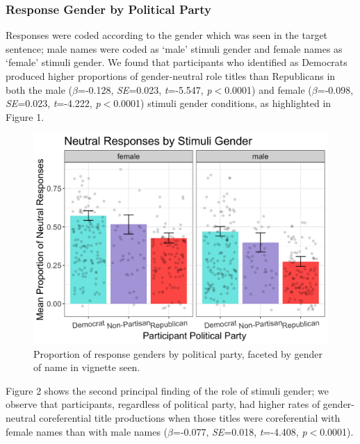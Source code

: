\documentclass[10pt,letterpaper]{article}
\begin{document}
	\subsubsection{Response Gender by Political Party}
	Responses were coded according to the gender which was seen in the target sentence; male names were coded as `male' stimuli gender and female names as `female' stimuli gender. We found that participants who identified as Democrats produced higher proportions of gender-neutral role titles than Republicans in both the male ($\beta$=-0.128, \textit{SE}=0.023, \textit{t}=-5.547, \textit{p}$<$0.0001) and female ($\beta$=-0.098, \textit{SE}=0.023, \textit{t}=-4.222, \textit{p}$<$0.0001) stimuli gender conditions, as highlighted in Figure 1.
	
	\begin{figure}[ht!]
		\centering
		\includegraphics[scale=0.115]{prod_neutral_poli_bar_nonmean.png}
		\caption{Proportion of response genders by political party, faceted by gender of name in vignette seen.}
		\label{prod-box}
	\end{figure}
	
	Figure 2 shows the second principal finding of the role of stimuli gender; we observe that participants, regardless of political party, had higher rates of gender-neutral coreferential title productions when those titles were coreferential with female names than with male names  ($\beta$=-0.077, \textit{SE}=0.018, \textit{t}=-4.408, \textit{p}$<$0.0001). 
	
\end{document}
